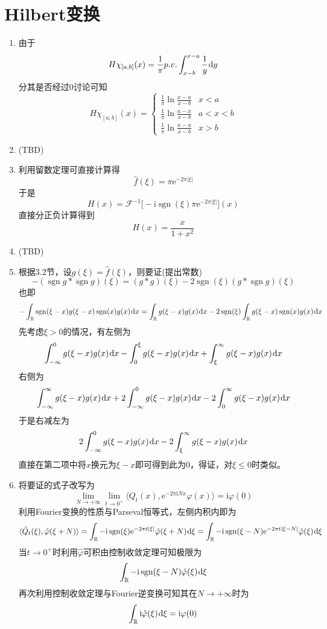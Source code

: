 \documentclass[a4paper,UTF8,fontset=windows]{ctexart}
\newcommand*{\er}{\mathrm{e}}
\newcommand*{\ir}{\mathrm{i}}
\newcommand*{\dr}{\hspace{0.07em}\mathrm{d}}
\DeclareMathOperator{\sgn}{sgn}
\begin{document}
\section{Hilbert变换}
\begin{enumerate}
    \item 由于
    $$H\chi_{[a,b]}(x)=\frac{1}{\pi}p.v.\int_{x-b}^{x-a}\frac{1}{y}\dr y$$
    分其是否经过0讨论可知
    $$H\chi_{[a,b]}(x)=\begin{cases}\frac{1}{\pi}\ln\frac{x-a}{x-b}&x<a\\\frac{1}{\pi}\ln\frac{a-x}{x-b}&a<x<b\\\frac{1}{\pi}\ln\frac{x-a}{x-b}&x>b\end{cases}$$

    \item (TBD)
    
    \item 利用留数定理可直接计算得
    $$\hat{f}(\xi)=\pi\er^{-2\pi|\xi|}$$
    于是
    $$H(x)=\mathcal{F}^{-1}\big[-\ir\sgn(\xi)\pi\er^{-2\pi|\xi|}\big](x)$$
    直接分正负计算得到
    $$H(x)=\frac{x}{1+x^2}$$

    \item (TBD)
    
    \item 根据3.2节，设$g(\xi)=\hat{f}(\xi)$，则要证(提出常数)
    $$-(\sgn g*\sgn g)(\xi)=(g*g)(\xi)-2\sgn(\xi)(g*\sgn g)(\xi)$$
    也即
    $$-\int_{\mathbb{R}}\sgn(\xi-x)g(\xi-x)\sgn(x)g(x)\dr x=\int_{\mathbb{R}}g(\xi-x)g(x)\dr x-2\sgn(\xi)\int_{\mathbb{R}}g(\xi-x)\sgn(x)g(x)\dr x$$
    先考虑$\xi>0$的情况，有左侧为
    $$\int_{-\infty}^0g(\xi-x)g(x)\dr x-\int_0^\xi g(\xi-x)g(x)\dr x+\int_\xi^\infty g(\xi-x)g(x)\dr x$$
    右侧为
    $$\int_{-\infty}^\infty g(\xi-x)g(x)\dr x+2\int_{-\infty}^0g(\xi-x)g(x)\dr x-2\int_0^\infty g(\xi-x)g(x)\dr x$$
    于是右减左为
    $$2\int_{-\infty}^0g(\xi-x)g(x)\dr x-2\int_\xi^\infty g(\xi-x)g(x)\dr x$$
    直接在第二项中将$x$换元为$\xi-x$即可得到此为0，得证，对$\xi\le0$时类似。

    \item 将要证的式子改写为
    $$\lim_{N\to+\infty}\lim_{t\to 0^+}\langle Q_t(x),\er^{-2\pi\ir Nx}\varphi(x)\rangle=\ir\varphi(0)$$
    利用Fourier变换的性质与Parseval恒等式，左侧内积内即为
    $$\langle\hat{Q}_t(\xi),\hat{\varphi}(\xi+N)\rangle=\int_\mathbb{R}-\ir\sgn(\xi)\er^{-2\pi t|\xi|}\hat{\varphi}(\xi+N)\dr\xi=\int_\mathbb{R}-\ir\sgn(\xi-N)\er^{-2\pi t|\xi-N|}\hat{\varphi}(\xi)\dr\xi$$
    当$t\to 0^+$时利用$\hat{\varphi}$可积由控制收敛定理可知极限为
    $$\int_\mathbb{R}-\ir\sgn(\xi-N)\hat{\varphi}(\xi)\dr\xi$$
    再次利用控制收敛定理与Fourier逆变换可知其在$N\to+\infty$时为
    $$\int_\mathbb{R}\ir\hat{\varphi}(\xi)\dr\xi=\ir\varphi(0)$$


\end{enumerate}
\end{document}
